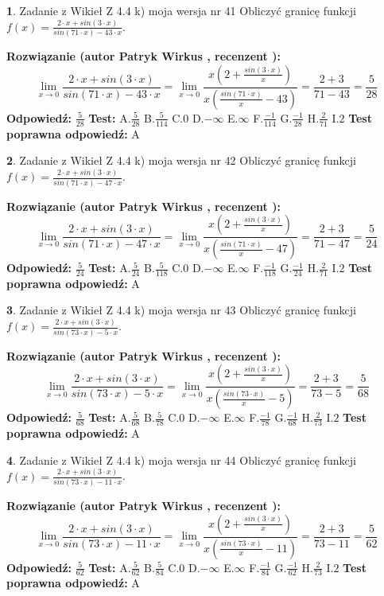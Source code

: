 \documentclass[12pt, a4paper]{article}
\theoremstyle{definition} %
\newtheorem{zad}{}
\newcommand{\zadStart}[1]{\begin{zad}#1\newline}
\newcommand{\zadStop}{\end{zad}}
\newcommand{\rozwStart}[2]{\noindent \textbf{Rozwiązanie (autor #1 , recenzent #2): }\newline}
\newcommand{\rozwStop}{\newline}
\newcommand{\odpStart}{\noindent \textbf{Odpowiedź:}\newline}
\newcommand{\odpStop}{\newline}
\newcommand{\testStart}{\noindent \textbf{Test:}\newline}
\newcommand{\testStop}{\newline}
\newcommand{\kluczStart}{\noindent \textbf{Test poprawna odpowiedź:}\newline}
\newcommand{\kluczStop}{\newline}
\begin{document}
\zadStart{Zadanie z Wikieł Z 4.4 k) moja wersja nr 41}
Obliczyć granicę funkcji $f(x)=\frac{2\cdot x +sin(3\cdot x)}{sin(71\cdot x) -43\cdot x}$.
\zadStop
\rozwStart{Patryk Wirkus}{}
$$\lim\limits_{x\to 0}\frac{2\cdot x +sin(3\cdot x)}{sin(71\cdot x) -43\cdot x}
=\lim\limits_{x\to 0}\frac{x(2+\frac{sin(3\cdot x)}{x})}{x(\frac{sin(71\cdot x)}{x}-43)}
=\frac{2+3}{71-43} = \frac{5}{28}$$
\rozwStop
\odpStart
$\frac{5}{28}$
\odpStop
\testStart
A.$\frac{5}{28}$
B.$\frac{5}{114}$
C.$0$
D.$-\infty$
E.$\infty$
F.$\frac{-1}{114}$
G.$\frac{-1}{28}$
H.$\frac{2}{71}$
I.$2$
\testStop
\kluczStart
A
\kluczStop



\zadStart{Zadanie z Wikieł Z 4.4 k) moja wersja nr 42}
Obliczyć granicę funkcji $f(x)=\frac{2\cdot x +sin(3\cdot x)}{sin(71\cdot x) -47\cdot x}$.
\zadStop
\rozwStart{Patryk Wirkus}{}
$$\lim\limits_{x\to 0}\frac{2\cdot x +sin(3\cdot x)}{sin(71\cdot x) -47\cdot x}
=\lim\limits_{x\to 0}\frac{x(2+\frac{sin(3\cdot x)}{x})}{x(\frac{sin(71\cdot x)}{x}-47)}
=\frac{2+3}{71-47} = \frac{5}{24}$$
\rozwStop
\odpStart
$\frac{5}{24}$
\odpStop
\testStart
A.$\frac{5}{24}$
B.$\frac{5}{118}$
C.$0$
D.$-\infty$
E.$\infty$
F.$\frac{-1}{118}$
G.$\frac{-1}{24}$
H.$\frac{2}{71}$
I.$2$
\testStop
\kluczStart
A
\kluczStop



\zadStart{Zadanie z Wikieł Z 4.4 k) moja wersja nr 43}
Obliczyć granicę funkcji $f(x)=\frac{2\cdot x +sin(3\cdot x)}{sin(73\cdot x) -5\cdot x}$.
\zadStop
\rozwStart{Patryk Wirkus}{}
$$\lim\limits_{x\to 0}\frac{2\cdot x +sin(3\cdot x)}{sin(73\cdot x) -5\cdot x}
=\lim\limits_{x\to 0}\frac{x(2+\frac{sin(3\cdot x)}{x})}{x(\frac{sin(73\cdot x)}{x}-5)}
=\frac{2+3}{73-5} = \frac{5}{68}$$
\rozwStop
\odpStart
$\frac{5}{68}$
\odpStop
\testStart
A.$\frac{5}{68}$
B.$\frac{5}{78}$
C.$0$
D.$-\infty$
E.$\infty$
F.$\frac{-1}{78}$
G.$\frac{-1}{68}$
H.$\frac{2}{73}$
I.$2$
\testStop
\kluczStart
A
\kluczStop



\zadStart{Zadanie z Wikieł Z 4.4 k) moja wersja nr 44}
Obliczyć granicę funkcji $f(x)=\frac{2\cdot x +sin(3\cdot x)}{sin(73\cdot x) -11\cdot x}$.
\zadStop
\rozwStart{Patryk Wirkus}{}
$$\lim\limits_{x\to 0}\frac{2\cdot x +sin(3\cdot x)}{sin(73\cdot x) -11\cdot x}
=\lim\limits_{x\to 0}\frac{x(2+\frac{sin(3\cdot x)}{x})}{x(\frac{sin(73\cdot x)}{x}-11)}
=\frac{2+3}{73-11} = \frac{5}{62}$$
\rozwStop
\odpStart
$\frac{5}{62}$
\odpStop
\testStart
A.$\frac{5}{62}$
B.$\frac{5}{84}$
C.$0$
D.$-\infty$
E.$\infty$
F.$\frac{-1}{84}$
G.$\frac{-1}{62}$
H.$\frac{2}{73}$
I.$2$
\testStop
\kluczStart
A
\kluczStop
\end{document}
